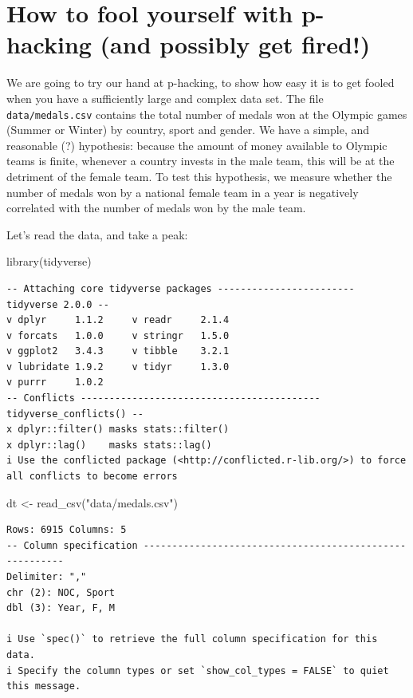 \documentclass[
  letterpaper,
  DIV=11,
  numbers=noendperiod]{scrreprt}
\newenvironment{Shaded}{\begin{snugshade}}{\end{snugshade}}
\newcommand{\FunctionTok}[1]{\textcolor[rgb]{0.28,0.35,0.67}{#1}}
\newcommand{\NormalTok}[1]{\textcolor[rgb]{0.00,0.23,0.31}{#1}}
\newcommand{\OtherTok}[1]{\textcolor[rgb]{0.00,0.23,0.31}{#1}}
\newcommand{\StringTok}[1]{\textcolor[rgb]{0.13,0.47,0.30}{#1}}
\begin{document}
\hypertarget{how-to-fool-yourself-with-p-hacking-and-possibly-get-fired}{%
\section{How to fool yourself with p-hacking (and possibly get
fired!)}\label{how-to-fool-yourself-with-p-hacking-and-possibly-get-fired}}

We are going to try our hand at p-hacking, to show how easy it is to get
fooled when you have a sufficiently large and complex data set. The file
\texttt{data/medals.csv} contains the total number of medals won at the
Olympic games (Summer or Winter) by country, sport and gender. We have a
simple, and reasonable (?) hypothesis: because the amount of money
available to Olympic teams is finite, whenever a country invests in the
male team, this will be at the detriment of the female team. To test
this hypothesis, we measure whether the number of medals won by a
national female team in a year is negatively correlated with the number
of medals won by the male team.

Let's read the data, and take a peak:

\begin{Shaded}
\begin{Highlighting}[]
\FunctionTok{library}\NormalTok{(tidyverse)}
\end{Highlighting}
\end{Shaded}

\begin{verbatim}
-- Attaching core tidyverse packages ------------------------ tidyverse 2.0.0 --
v dplyr     1.1.2     v readr     2.1.4
v forcats   1.0.0     v stringr   1.5.0
v ggplot2   3.4.3     v tibble    3.2.1
v lubridate 1.9.2     v tidyr     1.3.0
v purrr     1.0.2     
-- Conflicts ------------------------------------------ tidyverse_conflicts() --
x dplyr::filter() masks stats::filter()
x dplyr::lag()    masks stats::lag()
i Use the conflicted package (<http://conflicted.r-lib.org/>) to force all conflicts to become errors
\end{verbatim}

\begin{Shaded}
\begin{Highlighting}[]
\NormalTok{dt }\OtherTok{\textless{}{-}} \FunctionTok{read\_csv}\NormalTok{(}\StringTok{"data/medals.csv"}\NormalTok{)}
\end{Highlighting}
\end{Shaded}

\begin{verbatim}
Rows: 6915 Columns: 5
-- Column specification --------------------------------------------------------
Delimiter: ","
chr (2): NOC, Sport
dbl (3): Year, F, M

i Use `spec()` to retrieve the full column specification for this data.
i Specify the column types or set `show_col_types = FALSE` to quiet this message.
\end{verbatim}
\end{document}

